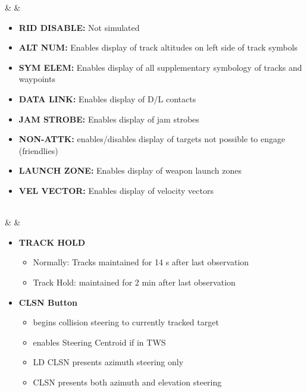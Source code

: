 \documentclass[fontInter]{TechCheck}
\begin{document}
\begin{listlongtable}
		\midrule
		\textbf{\textbullet} &    &
		\begin{minipage}[t]{\linewidth}
			\vspace{-7pt}
			\begin{itemize}
				\item \textbf{RID DISABLE:} Not simulated
				\item \textbf{ALT NUM:} Enables display of track altitudes on left side of track symbols
				\item \textbf{SYM ELEM:} Enables display of all supplementary symbology of tracks and waypoints
				\item \textbf{DATA LINK:} Enables display of D/L contacts
				\item \textbf{JAM STROBE:} Enables display of jam strobes
				\item \textbf{NON-ATTK:} enables/disables display of targets not possible to engage (friendlies)
				\item \textbf{LAUNCH ZONE:} Enables display of weapon launch zones
				\item \textbf{VEL VECTOR:} Enables display of velocity vectors
			\end{itemize}
		\end{minipage} \\
		\midrule
		\textbf{\textbullet} &    &
		\begin{minipage}[t]{\linewidth}
			\vspace{-7pt}
			\begin{itemize}
				\item \textbf{TRACK HOLD}
				\begin{itemize}
					\item Normally: Tracks maintained for 14 s after last observation
					\item Track Hold: maintained for 2 min after last observation
				\end{itemize}
				\item \textbf{CLSN Button}
				\begin{itemize}
					\item begins collision steering to currently tracked target
					\item enables Steering Centroid if in TWS
					\item LD CLSN presents azimuth steering only
					\item CLSN presents both azimuth and elevation steering
				\end{itemize}

\end{itemize}
\end{minipage}
\end{listlongtable}
\end{document}
